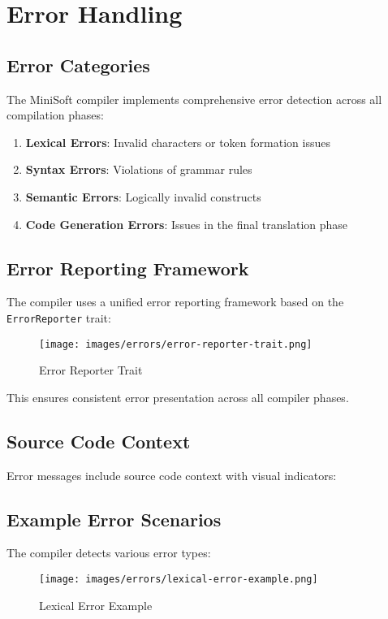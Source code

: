 \documentclass[12pt,a4paper]{article}
\begin{document}
\section{Error Handling}
\subsection{Error Categories}
The MiniSoft compiler implements comprehensive error detection across all compilation phases:

\begin{enumerate}
	\item \textbf{Lexical Errors}: Invalid characters or token formation issues
	\item \textbf{Syntax Errors}: Violations of grammar rules
	\item \textbf{Semantic Errors}: Logically invalid constructs
	\item \textbf{Code Generation Errors}: Issues in the final translation phase
\end{enumerate}

\subsection{Error Reporting Framework}
The compiler uses a unified error reporting framework based on the \texttt{ErrorReporter} trait:

\begin{figure}[H]
	\centering
	\texttt{[image: images/errors/error-reporter-trait.png]}
	\caption{Error Reporter Trait}
\end{figure}

This ensures consistent error presentation across all compiler phases.

\subsection{Source Code Context}
Error messages include source code context with visual indicators:

\subsection{Example Error Scenarios}
The compiler detects various error types:


\begin{figure}[H]
	\centering
	\texttt{[image: images/errors/lexical-error-example.png]}
	\caption{Lexical Error Example}
\end{figure}
\end{document}

